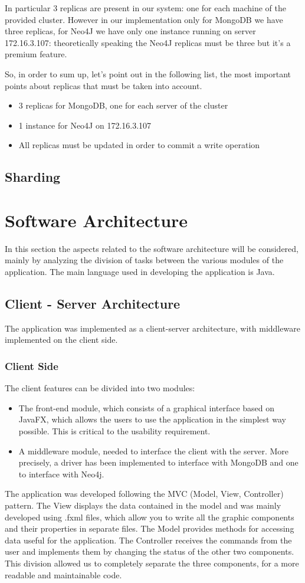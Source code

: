 \documentclass[a4paper]{report}
\begin{document}
\noindent In particular 3 replicas are present in our system: one for each machine of the provided cluster. However in our implementation only for MongoDB we have three replicas, for Neo4J we have only one instance running on server 172.16.3.107: theoretically speaking the Neo4J replicas must be three but it's a premium feature.

\noindent So, in order to sum up, let's point out in the following list, the most important points about replicas that must be taken into account.
\begin{itemize}
	\item 3 replicas for MongoDB, one for each server of the cluster
	\item 1 instance for Neo4J on 172.16.3.107
	\item All replicas must be updated in order to commit a write operation
\end{itemize}

\subsection{Sharding}


\section{Software Architecture}
In this section the aspects related to the software architecture will be considered, mainly by analyzing the division of tasks between the various modules of the application. The main language used in developing the application is Java.
\subsection{Client - Server Architecture}
The application was implemented as a client-server architecture, with middleware implemented on the client side.
\subsubsection{Client Side}
The client features can be divided into two modules:
\begin{itemize}
\item The front-end module, which consists of a graphical interface based on JavaFX, which allows the users to use the application in the simplest way possible. This is critical to the usability requirement.
\item A middleware module, needed to interface the client with the server. More precisely, a driver has been implemented to interface with MongoDB and one to interface with Neo4j.
\end{itemize}
\noindent The application was developed following the MVC (Model, View, Controller) pattern. The View displays the data contained in the model and was mainly developed using .fxml files, which allow you to write all the graphic components and their properties in separate files. The Model provides methods for accessing data useful for the application. The Controller receives the commands from the user and implements them by changing the status of the other two components. This division allowed us to completely separate the three components, for a more readable and maintainable code.
\end{document}
